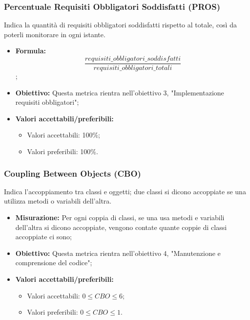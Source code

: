 \subsubsection{Percentuale Requisiti Obbligatori Soddisfatti (PROS)}
Indica la quantità di requisiti obbligatori soddisfatti rispetto al totale, così da poterli monitorare in ogni istante.
\begin{itemize}
	\item \textbf{Formula:}\[\frac{requisiti\_obbligatori\_soddisfatti}{requisiti\_obbligatori\_totali}\];
	\item \textbf{Obiettivo:} Questa metrica rientra nell'obiettivo 3, "Implementazione requisiti obbligatori";
	\item \textbf{Valori accettabili/preferibili: }
	\begin{itemize}
		\item Valori accettabili: 100\%;
		\item Valori preferibili: 100\%.
	\end{itemize}
\end{itemize}



\subsubsection{Coupling Between Objects (CBO)}
Indica l'accoppiamento tra classi e oggetti; due classi si dicono accoppiate se una utilizza metodi o variabili dell'altra.
\begin{itemize}
	\item \textbf{Misurazione:} Per ogni coppia di classi, se una usa metodi e variabili dell'altra si dicono accoppiate, vengono contate quante coppie di classi accoppiate ci sono;
	\item \textbf{Obiettivo:} Questa metrica rientra nell'obiettivo 4, "Manutenzione e comprensione del codice";
	\item \textbf{Valori accettabili/preferibili: }
	\begin{itemize}
		\item Valori accettabili: $0\leq CBO \leq 6$;
		\item Valori preferibili: $0\leq CBO \leq 1$.
	\end{itemize}
\end{itemize}

